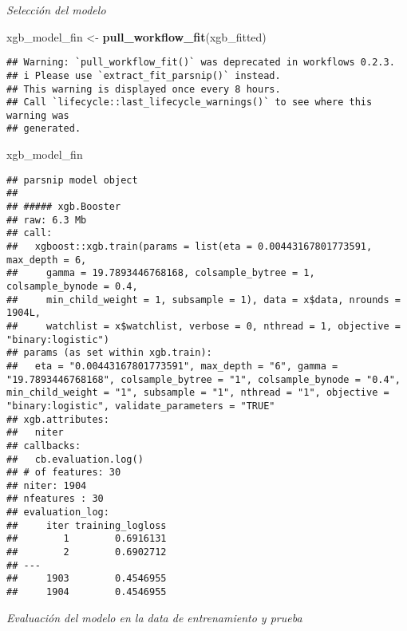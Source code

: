 \documentclass[
]{article}
\newenvironment{Shaded}{\begin{snugshade}}{\end{snugshade}}
\newcommand{\AttributeTok}[1]{\textcolor[rgb]{0.13,0.29,0.53}{#1}}
\newcommand{\FunctionTok}[1]{\textcolor[rgb]{0.13,0.29,0.53}{\textbf{#1}}}
\newcommand{\NormalTok}[1]{#1}
\newcommand{\OtherTok}[1]{\textcolor[rgb]{0.56,0.35,0.01}{#1}}
\newcommand{\SpecialCharTok}[1]{\textcolor[rgb]{0.81,0.36,0.00}{\textbf{#1}}}
\begin{document}
\emph{Selección del modelo}

\begin{Shaded}
\begin{Highlighting}[]
\NormalTok{xgb\_model\_fin }\OtherTok{\textless{}{-}} \FunctionTok{pull\_workflow\_fit}\NormalTok{(xgb\_fitted)}
\end{Highlighting}
\end{Shaded}

\begin{verbatim}
## Warning: `pull_workflow_fit()` was deprecated in workflows 0.2.3.
## i Please use `extract_fit_parsnip()` instead.
## This warning is displayed once every 8 hours.
## Call `lifecycle::last_lifecycle_warnings()` to see where this warning was
## generated.
\end{verbatim}

\begin{Shaded}
\begin{Highlighting}[]
\NormalTok{xgb\_model\_fin}
\end{Highlighting}
\end{Shaded}

\begin{verbatim}
## parsnip model object
## 
## ##### xgb.Booster
## raw: 6.3 Mb 
## call:
##   xgboost::xgb.train(params = list(eta = 0.00443167801773591, max_depth = 6, 
##     gamma = 19.7893446768168, colsample_bytree = 1, colsample_bynode = 0.4, 
##     min_child_weight = 1, subsample = 1), data = x$data, nrounds = 1904L, 
##     watchlist = x$watchlist, verbose = 0, nthread = 1, objective = "binary:logistic")
## params (as set within xgb.train):
##   eta = "0.00443167801773591", max_depth = "6", gamma = "19.7893446768168", colsample_bytree = "1", colsample_bynode = "0.4", min_child_weight = "1", subsample = "1", nthread = "1", objective = "binary:logistic", validate_parameters = "TRUE"
## xgb.attributes:
##   niter
## callbacks:
##   cb.evaluation.log()
## # of features: 30 
## niter: 1904
## nfeatures : 30 
## evaluation_log:
##     iter training_logloss
##        1        0.6916131
##        2        0.6902712
## ---                      
##     1903        0.4546955
##     1904        0.4546955
\end{verbatim}

\emph{Evaluación del modelo en la data de entrenamiento y prueba}

\begin{Shaded}
\end{Shaded}
\end{document}
